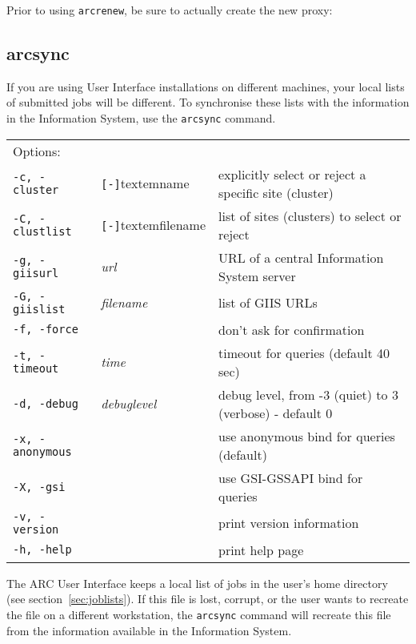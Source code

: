 Prior to using \texttt{arcrenew}, be sure to actually create the
new proxy:

\subsection{arcsync}
\label{sec:arcsync}

If you are using User Interface installations on different machines,
your local lists of submitted jobs will be different. To synchronise
these lists with the information in the Information System, use the
\texttt{arcsync}  command.

\hspace*{0.5cm}
\begin{shaded}
\end{shaded}
\begin{longtable}{llp{8cm}}
   Options:&&\\
   \texttt{-c, -cluster}&\verb#[-]#textem{name}&explicitly select or reject a specific site (cluster)\\
   \texttt{-C, -clustlist}&\verb#[-]#textem{filename}&list of sites (clusters) to select or reject\\
   \texttt{-g, -giisurl}& \textit{url} &URL of a central Information System server\\
   \texttt{-G, -giislist}&\textit{filename}&list of GIIS URLs\\
   \texttt{-f, -force}&&don't ask for confirmation\\
   \texttt{-t, -timeout}& \textit{time} & timeout for queries (default 40 sec)\\
   \texttt{-d, -debug}& \textit{debuglevel} &debug level, from -3 (quiet) to 3 (verbose) - default 0\\
   \texttt{-x, -anonymous}& & use anonymous bind for queries (default)\\
   \texttt{-X, -gsi}& & use GSI-GSSAPI bind for queries\\
   \texttt{-v, -version}& & print version information\\
   \texttt{-h, -help}& & print help page\\
\end{longtable}

The ARC User Interface keeps a local list of jobs in the user's home
directory (see section~\ref{sec:joblists}). If this file is lost,
corrupt, or the user wants to recreate the file on a different
workstation, the \texttt{arcsync} command will recreate this file from
the information available in the Information System.

